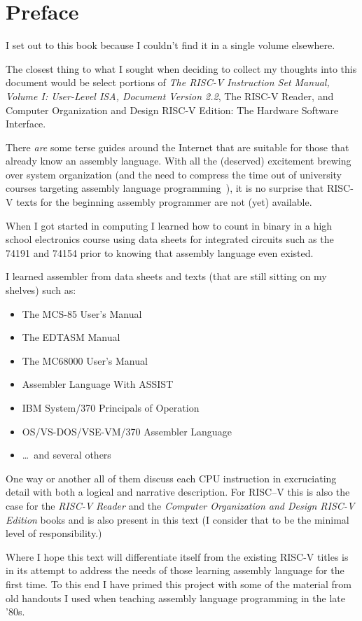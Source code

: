 \chapter{Preface}
\label{chapter:Preface}

I set out to this book because I couldn't find it in a single volume elsewhere.

The closest thing to what I sought when deciding to collect my thoughts
into this document would be select portions of 
{\em The RISC-V Instruction Set Manual, Volume I: User-Level ISA, Document Version 2.2}\cite{rvismv1v22:2017}, 
{The RISC-V Reader}\cite{riscvreader:2017}, and 
{Computer Organization and Design RISC-V Edition: The Hardware Software Interface}\cite{codriscv:2017}.

There {\em are} some terse guides around the Internet that are suitable 
for those that already know an assembly language.  With all the (deserved) 
excitement brewing over system organization (and the need to compress the 
time out of university courses targeting assembly language 
programming~\cite{Decker:1985:MAT:989369.989375}),
it is no surprise that RISC-V texts for the beginning assembly programmer 
are not (yet) available.

When I got started in computing I learned how to count in binary 
in a high school electronics course using data sheets for integrated 
circuits such as the 74191\cite{ttl74191:1979} and 74154\cite{ttl74154:1979} 
prior to knowing that assembly language even existed.

I learned assembler from data sheets and texts (that are still sitting on 
my shelves) such as:
\begin{itemize}
\item The MCS-85 User's Manual\cite{mcs85:1978}
\item The EDTASM Manual\cite{edtasm:1978}
\item The MC68000 User's Manual\cite{mc68000:1980}
\item Assembler Language With ASSIST\cite{assist:1983}
\item IBM System/370 Principals of Operation\cite{poo:1980}
\item OS/VS-DOS/VSE-VM/370 Assembler Language\cite{assembler370:1979}
\item \ldots\ and several others
\end{itemize}

One way or another all of them discuss each CPU instruction in excruciating detail 
with both a logical and narrative description.  For RISC--V this is 
also the case for the {\em RISC-V Reader}\cite{riscvreader:2017} and the 
{\em Computer Organization and Design RISC-V Edition}\cite{codriscv:2017} books
and is also present in this text (I consider that to be the minimal 
level of responsibility.)

Where I hope this text will differentiate itself from the existing RISC-V 
titles is in its attempt to address the needs of those learning assembly 
language for the first time.  To this end I have primed this project with 
some of the material from old handouts I used when teaching assembly language 
programming in the late '80s.
